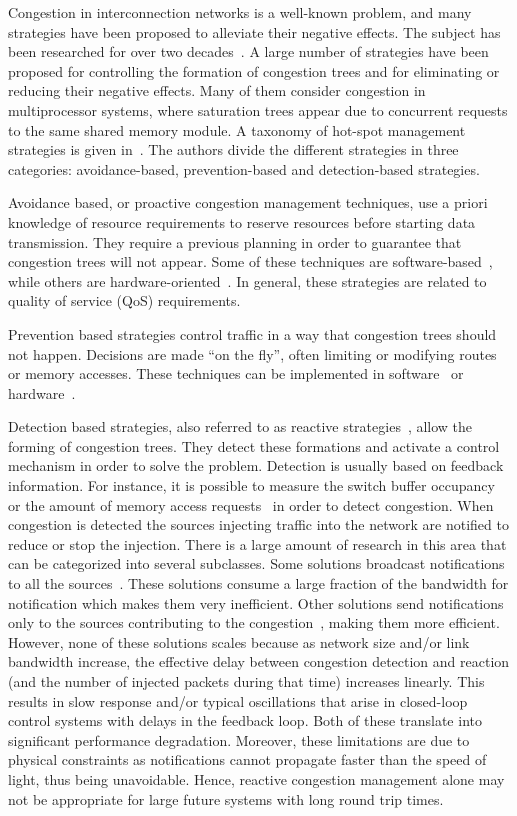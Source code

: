 Congestion in interconnection networks is a well-known problem, and many strategies have been proposed to alleviate their negative effects. The subject has been researched for over two decades~\cite{PN85}. A large number of strategies have been proposed for controlling the formation of congestion trees and for eliminating or reducing their negative effects. Many of them consider congestion in multiprocessor systems, where saturation trees appear due to concurrent requests to the same shared memory module. A taxonomy of hot-spot management strategies is given in~\cite{pD99}. The authors divide the different strategies in three categories: avoidance-based, prevention-based and detection-based strategies. 

Avoidance based, or proactive congestion management techniques, use a priori knowledge of resource requirements to reserve resources before starting data transmission. They require a previous planning in order to guarantee that congestion trees will not appear. Some of these techniques are software-based~\cite{BLKC93,YTL87}, while others are hardware-oriented~\cite{WSNA95}. In general, these strategies are related to quality of service (QoS) requirements.

Prevention based strategies control traffic in a way that congestion trees should not happen. Decisions are made “on the fly”, often limiting or modifying routes or memory accesses. These techniques can be implemented in software~\cite{HE89} or hardware~\cite{AG94,SS90}.

Detection based strategies, also referred to as reactive strategies~\cite{paper2}, allow the forming of congestion trees. They detect these formations and activate a control mechanism in order to solve the problem.  Detection is usually based on feedback information. For instance, it is possible to measure the switch buffer occupancy~\cite{LSC95,V00} or the amount of memory access requests~\cite{SS90} in order to detect congestion. When congestion is detected the sources injecting traffic into the network are notified to reduce or stop the injection. There is a large amount of research in this area that can be categorized into several subclasses. Some solutions broadcast notifications to all the sources~\cite{TLM01, V00}. These solutions consume a large fraction of the bandwidth for notification which makes them very inefficient. Other solutions send notifications only to the sources contributing to the congestion~\cite{KLC97}, making them more efficient. However, none of these solutions scales because as network size and/or link bandwidth increase, the effective delay between congestion detection and reaction (and the number of injected packets during that time) increases linearly. This results in slow response and/or typical oscillations that arise in closed-loop control systems with delays in the feedback loop. Both of these translate into significant performance degradation. Moreover, these limitations are due to physical constraints as notifications cannot propagate faster than the speed of light, thus being unavoidable. Hence, reactive congestion management alone may not be appropriate for large future systems with long round trip times.

